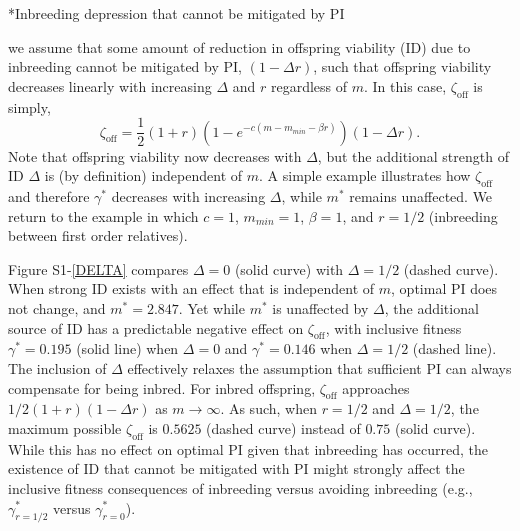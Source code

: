 \documentclass[12pt]{article}
\makeatletter
\renewcommand\section{\@startsection{section}{1}{0in}{-0.5\baselineskip}{0.1\baselineskip}{\normalfont\large\bfseries}}
\makeatother
\begin{document}
\doublespacing
\clearpage

\section*{Inbreeding depression that cannot be mitigated by PI}

 we assume that some amount of reduction in offspring viability (ID) due to inbreeding cannot be mitigated by PI, $(1 - \Delta r)$, such that offspring viability decreases linearly with increasing $\Delta$ and $r$ regardless of $m$. In this case, $\zeta_{\textrm{off}}$ is simply,
\begin{equation}
\zeta_{\textrm{off}} = \frac{1}{2}\left(1+r\right)\left(1-e^{-c\left(m-m_{min}-\beta r\right)}\right) \left(1 - \Delta r\right).
\end{equation}
Note that offspring viability now decreases with $\Delta$, but the additional strength of ID $\Delta$ is (by definition) independent of $m$. A simple example illustrates how $\zeta_{\textrm{off}}$ and therefore $\gamma^{*}$ decreases with increasing $\Delta$, while $m^{*}$ remains unaffected. We return to the example in which $c=1$, $m_{min}=1$, $\beta=1$, and $r=1/2$ (inbreeding between first order relatives).

Figure S1-\ref{DELTA} compares $\Delta=0$ (solid curve) with $\Delta=1/2$ (dashed curve). When strong ID exists with an effect that is independent of $m$, optimal PI does not change, and $m^{*}=2.847$. Yet while $m^{*}$ is unaffected by $\Delta$, the additional source of ID has a predictable negative effect on $\zeta_{\textrm{off}}$, with inclusive fitness $\gamma^{*}=0.195$ (solid line) when $\Delta=0$ and $\gamma^{*}=0.146$ when $\Delta=1/2$ (dashed line). The inclusion of $\Delta$ effectively relaxes the assumption that sufficient PI can always compensate for being inbred. For inbred offspring, $\zeta_{\textrm{off}}$ approaches $1/2(1+r)(1 - \Delta r)$ as $m \to \infty$. As such, when $r=1/2$ and $\Delta=1/2$, the maximum possible $\zeta_{\textrm{off}}$ is $0.5625$ (dashed curve) instead of $0.75$ (solid curve). While this has no effect on optimal PI given that inbreeding has occurred, the existence of ID that cannot be mitigated with PI might strongly affect the inclusive fitness consequences of inbreeding versus avoiding inbreeding (e.g., $\gamma^{*}_{r=1/2}$ versus $\gamma^{*}_{r=0}$).
\end{document}
